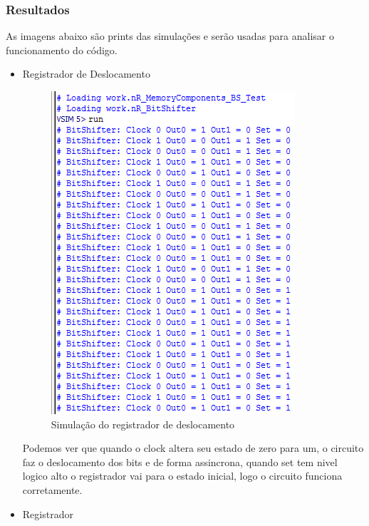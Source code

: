 \documentclass[a4paper, 10pt]{article}
\begin{document}
\subsubsection{Resultados}
As imagens abaixo são prints das simulações e serão usadas para analisar o funcionamento do código.
\begin{itemize}
	\item Registrador de Deslocamento\\
	\begin{figure}[H]
		\centering
		\includegraphics[scale=0.7]{BSsimu.PNG}
		\caption{Simulação do registrador de deslocamento}
		\label{Rotulo}
	\end{figure}
	Podemos ver que quando o clock altera seu estado de zero para um, o circuito faz o deslocamento dos bits e de forma assincrona, quando set tem nivel logico alto o registrador vai para o estado inicial, logo o circuito funciona corretamente.
	\item Registrador\\
	\begin{figure}[H]
		\centering

\end{figure}
\end{itemize}
\end{document}
